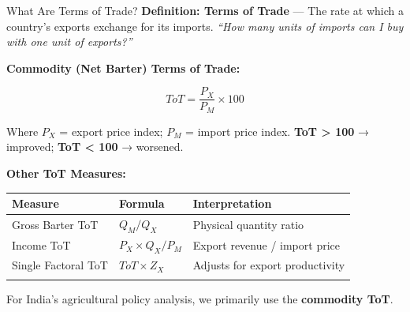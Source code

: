 \documentclass[
  ignorenonframetext,
  aspectratio=169,
]{beamer}
\makeatletter
\let\quarto@originallabel\label
\DeclareRobustCommand*{\label}[1]{\quarto@originallabel{#1}}
\makeatother
\begin{document}
\begin{frame}{What Are Terms of Trade?}
\label{what-are-terms-of-trade}
\textbf{Definition: Terms of Trade} --- The rate at which a country's
exports exchange for its imports. \emph{``How many units of imports can
I buy with one unit of exports?''}

\textbf{Commodity (Net Barter) Terms of Trade:}

\[ToT = \frac{P_X}{P_M} \times 100\]

Where \(P_X\) = export price index; \(P_M\) = import price index.
\textbf{ToT \textgreater{} 100} → improved; \textbf{ToT \textless{} 100}
→ worsened.

\textbf{Other ToT Measures:}

\begin{longtable}[]{@{}
  >{\raggedright\arraybackslash}p{}
  >{\raggedright\arraybackslash}p{}
  >{\raggedright\arraybackslash}p{}@{}}
\toprule\noalign{}
\begin{minipage}[b]{\linewidth}\raggedright
Measure
\end{minipage} & \begin{minipage}[b]{\linewidth}\raggedright
Formula
\end{minipage} & \begin{minipage}[b]{\linewidth}\raggedright
Interpretation
\end{minipage} \\
\midrule\noalign{}
\endhead
Gross Barter ToT & \(Q_M/Q_X\) & Physical quantity ratio \\
Income ToT & \(P_X \times Q_X / P_M\) & Export revenue / import price \\
Single Factoral ToT & \(ToT \times Z_X\) & Adjusts for export
productivity \\
\bottomrule\noalign{}
\end{longtable}

For India's agricultural policy analysis, we primarily use the
\textbf{commodity ToT}.
\end{frame}
\end{document}
